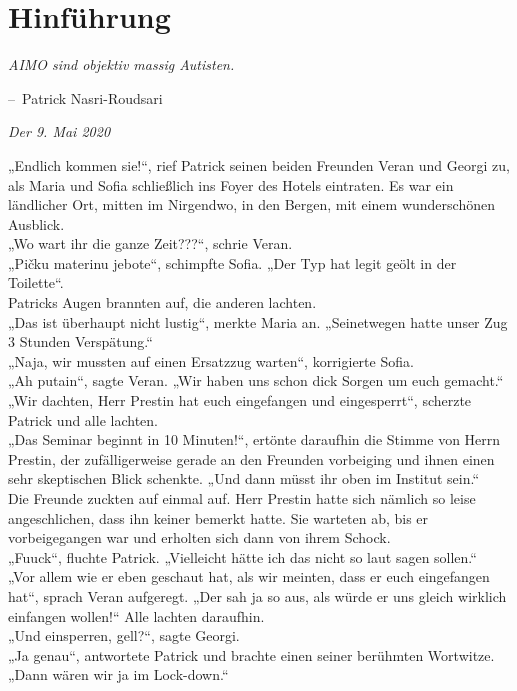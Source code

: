 \documentclass[oneside]{memoir}
\makeatletter
\newenvironment{chapquote}[2][2em]
  {\setlength{\@tempdima}{#1}%
   \def\chapquote@author{#2}%
   \parshape 1 \@tempdima \dimexpr\textwidth-2\@tempdima\relax%
   \itshape}
  {\par\normalfont\hfill--\ \chapquote@author\hspace*{\@tempdima}\par\bigskip}
\makeatother
\begin{document}
\chapter{Hinführung} %
\begin{chapquote}{Patrick Nasri-Roudsari}
\glqq AIMO sind objektiv massig Autisten.\grqq
\end{chapquote}
\textit{Der 9. Mai 2020}

\medskip
\noindent „Endlich kommen sie!“, rief Patrick seinen beiden Freunden Veran und Georgi zu, als Maria und Sofia schließlich ins Foyer des Hotels eintraten. Es war ein ländlicher Ort, mitten im Nirgendwo, in den Bergen, mit einem wunderschönen Ausblick.  \\
„Wo wart ihr die ganze Zeit???“, schrie Veran.  \\
„Pičku materinu jebote“, schimpfte Sofia. „Der Typ hat legit geölt in der Toilette“.  \\
Patricks Augen brannten auf, die anderen lachten. \\
„Das ist überhaupt nicht lustig“, merkte Maria an. „Seinetwegen hatte unser Zug 3 Stunden Verspätung.“ \\
„Naja, wir mussten auf einen Ersatzzug warten“, korrigierte Sofia. \\
„Ah putain“, sagte Veran. „Wir haben uns schon dick Sorgen um euch gemacht.“ \\
„Wir dachten, Herr Prestin hat euch eingefangen und eingesperrt“, scherzte Patrick und alle lachten.  \\
„Das Seminar beginnt in 10 Minuten!“, ertönte daraufhin die Stimme von Herrn Prestin, der zufälligerweise gerade an den Freunden vorbeiging und ihnen einen sehr skeptischen Blick schenkte. „Und dann müsst ihr oben im Institut sein.“  \\
Die Freunde zuckten auf einmal auf. Herr Prestin hatte sich nämlich so leise angeschlichen, dass ihn keiner bemerkt hatte. Sie warteten ab, bis er vorbeigegangen war und erholten sich dann von ihrem Schock.  \\
„Fuuck“, fluchte Patrick. „Vielleicht hätte ich das nicht so laut sagen sollen.“ \\
„Vor allem wie er eben geschaut hat, als wir meinten, dass er euch eingefangen hat“, sprach Veran aufgeregt. „Der sah ja so aus, als würde er uns gleich wirklich einfangen wollen!“ Alle lachten daraufhin.  \\
„Und einsperren, gell?“, sagte Georgi.  \\
„Ja genau“, antwortete Patrick und brachte einen seiner berühmten Wortwitze. „Dann wären wir ja im Lock-down.“ \\
\end{document}
